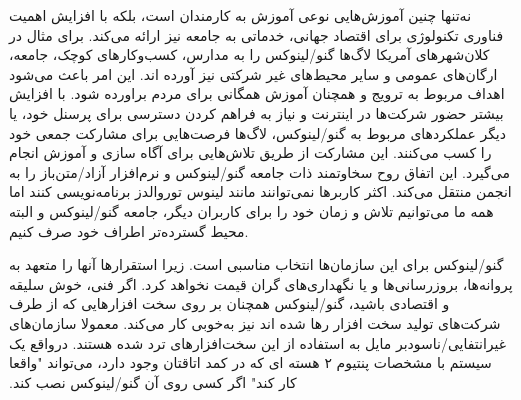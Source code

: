 نه‌تنها چنین آموزش‌هایی نوعی آموزش به کارمندان است، بلکه با افزایش
اهمیت فناوری تکنولوژی برای اقتصاد جهانی، خدماتی به جامعه نیز ارائه می‌کند.
برای مثال در کلان‌شهر‌های آمریکا لاگ‌ها گنو/لینوکس را به مدارس، کسب‌و‌کار‌های کوچک،
جامعه،  ارگان‌های عمومی و سایر محیط‌های غیر شرکتی نیز آورده اند.
این امر باعث می‌شود اهداف مربوط به ترویج و همچنان آموزش همگانی برای مردم براورده شود.
با افزایش بیشتر حضور شرکت‌ها در اینترنت و نیاز به فراهم کردن دسترسی برای پرسنل خود،
یا دیگر عملکرد‌های مربوط به گنو/لینوکس، لاگ‌ها فرصت‌هایی برای مشارکت جمعی خود را کسب می‌کنند.
این مشارکت از طریق تلاش‌هایی برای آگاه سازی و آموزش انجام می‌گیرد.
این اتفاق روح سخاوتمند ذات جامعه گنو/لینوکس و نرم‌افزار‌ آزاد/متن‌باز را به انجمن منتقل می‌کند.
اکثر کاربرها نمی‌توانند مانند لینوس توروالدز برنامه‌نویسی کنند اما همه ما می‌توانیم تلاش و زمان خود را
برای کاربران دیگر، جامعه گنو/لینوکس و البته محیط گسترده‌تر اطراف خود صرف کنیم.

گنو/لینوکس برای این سازمان‌ها انتخاب مناسبی است. زیرا استقرارها
آنها را متعهد به پروانه‌ها، بروزرسانی‌ها و یا نگهداری‌های گران قیمت
نخواهد کرد. اگر فنی، خوش سلیقه و اقتصادی باشید، گنو/لینوکس همچنان بر روی
سخت افزار‌هایی که از طرف شرکت‌های تولید سخت افزار رها شده اند نیز ‫به‌خوبی
کار می‌کند. معمولا سازمان‌های غیرانتفایی/ناسودبر مایل به استفاده از این
سخت‌افزار‌های ترد شده هستند. درواقع یک سیستم با مشخصات پنتیوم ۲ هسته ای
که در کمد اتاقتان وجود دارد، می‌تواند "واقعا کار کند" اگر کسی روی آن
گنو/لینوکس نصب کند.



